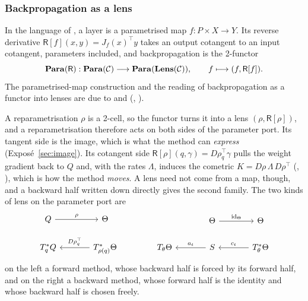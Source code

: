 \subsubsection{Backpropagation as a lens}\label{sec:lens-functor}

In the language of , a layer is a parametrised map $f:P\times X\to Y$. Its reverse derivative
$\mathsf R[f](x,y)=J_f(x)^\top y$ takes an output cotangent to an input cotangent, parameters included, and
backpropagation is the 2-functor
\begin{equation}\label{eq:lens-functor}
  \Para(\mathsf R):\Para(\mathcal C)\longrightarrow\Para(\Lens(\mathcal C)),\qquad f\longmapsto(f,\mathsf R[f]).
\end{equation}
The parametrised-map construction and the reading of backpropagation as a functor into lenses are due to
\citet{fong2017backprop} and \citet{cruttwell2021categorical} (, ).

A reparametrisation $\rho$ is a 2-cell, so the functor turns it into a lens $(\rho,\mathsf R[\rho])$, and a
reparametrisation therefore acts on both sides of the parameter port. Its tangent side is the image, which is what the
method can \emph{express} (Exposé~\ref{sec:image}). Its cotangent side $\mathsf R[\rho](q,\gamma)=D\rho_q^\top\gamma$
pulls the weight gradient back to $Q$ and, with the rates $\Lambda$, induces the cometric $K=D\rho\,\Lambda\,D\rho^\top$
(, ), which is how the method \emph{moves}. A lens need not come from a map,
though, and a backward half written down directly gives the second family. The two kinds of lens on the parameter port
are
\[
\begin{tikzcd}[column sep=large,row sep=normal]
  Q \arrow[r,"\rho"] & \Theta \\
  T^*_qQ & T^*_{\rho(q)}\Theta \arrow[l,"D\rho_q^{\top}"']
\end{tikzcd}
\qquad\qquad
\begin{tikzcd}[column sep=large,row sep=normal]
  & \Theta \arrow[r,"\id_\Theta"] & \Theta \\
  T_\theta\Theta & S \arrow[l,"a_t"'] & T^*_\theta\Theta \arrow[l,"c_t"']
\end{tikzcd}
\]
on the left a forward method, whose backward half is forced by its forward half, and on the right a backward method,
whose forward half is the identity and whose backward half is chosen freely.

